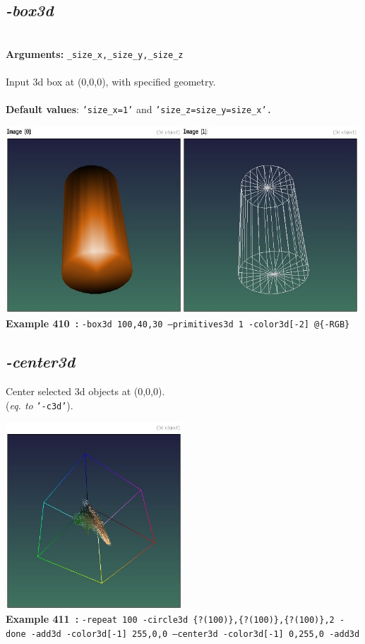 \documentclass[a4paper,11pt,twoside]{book}
\begin{document}
\subsection{\emph{-box3d} }\vspace*{-0.5em}
~\\\textbf{Arguments: } 
{\small \texttt{\_size\_x,\_size\_y,\_size\_z}}\\~\\
Input 3d box at (0,0,0), with specified geometry.
~\\~\\\textbf{Default values}: {\small \texttt{'size\_x=1'} and \texttt{'size\_z=size\_y=size\_x'.}}
\begin{center}\includegraphics[keepaspectratio=true,height=7cm,width=\textwidth]{img/gmic_def410.jpg}\\
{\footnotesize \textbf{Example 410~:} \texttt{-box3d 100,40,30 --primitives3d 1 -color3d[-2] @\{-RGB\}}}
\end{center}

\subsection{\emph{-center3d} }\vspace*{-0.5em}
Center selected 3d objects at (0,0,0).
~\\(\emph{eq. to} {\small \texttt{'-c3d'}}).
\begin{center}\includegraphics[keepaspectratio=true,height=7cm,width=\textwidth]{img/gmic_def411.jpg}\\
{\footnotesize \textbf{Example 411~:} \texttt{-repeat 100 -circle3d \{?(100)\},\{?(100)\},\{?(100)\},2 -done -add3d -color3d[-1] 255,0,0 --center3d -color3d[-1] 0,255,0 -add3d}}
\end{center}
\end{document}
